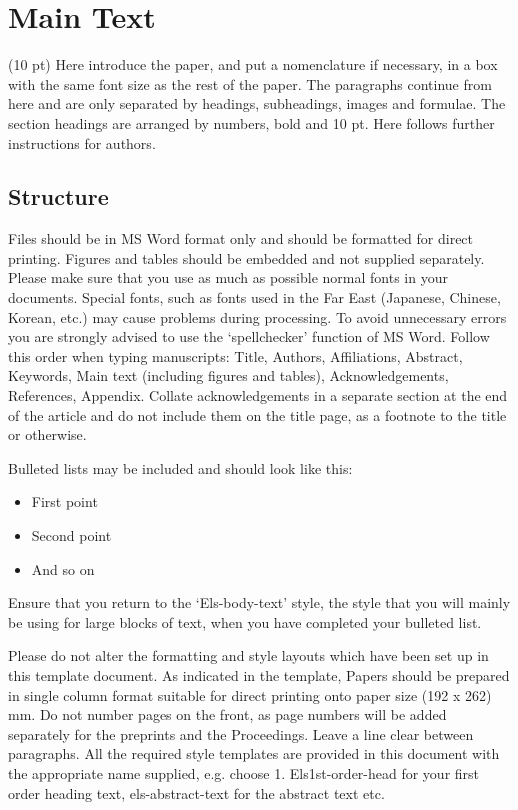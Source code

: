 \documentclass[3p,times,procedia]{elsarticle}
\begin{document}


\section{Main Text}
\label{main}

(10 pt) Here introduce the paper, and put a nomenclature if necessary, in a box with the same font size as the rest of the paper. The paragraphs continue from here and are only separated by headings, subheadings, images and formulae.  The section headings are arranged by numbers, bold and 10 pt.  Here follows further instructions for authors.


\subsection{ Structure}
Files should be in MS Word format only and should be formatted for direct printing. Figures and tables should be embedded and not supplied separately. Please make sure that you use as much as possible normal fonts in your documents. Special fonts, such as fonts used in the Far East (Japanese, Chinese, Korean, etc.) may cause problems during processing. To avoid unnecessary errors you are strongly advised to use the ‘spellchecker’ function of MS Word. Follow this order when typing manuscripts: Title, Authors, Affiliations, Abstract, Keywords, Main text (including figures and tables), Acknowledgements, References, Appendix. Collate acknowledgements in a separate section at the end of the article and do not include them on the title page, as a footnote to the title or otherwise. 

Bulleted lists may be included and should look like this:
\begin{itemize}[]
\item First point
\item Second point
\item And so on
\end{itemize}

Ensure that you return to the `Els-body-text' style, the style that you will mainly be using for large blocks of text, when you have completed your bulleted list.

Please do not alter the formatting and style layouts which have been set up in this template document. As indicated in the template, Papers should be prepared in single column format suitable for direct printing onto paper size (192 x 262) mm. Do not number pages on the front, as page numbers will be added separately for the preprints and the Proceedings. Leave a line clear between paragraphs. All the required style templates are provided in this document with the appropriate name supplied, e.g. choose 1. Els1st-order-head for your first order heading text, els-abstract-text for the abstract text etc.
\end{document}

